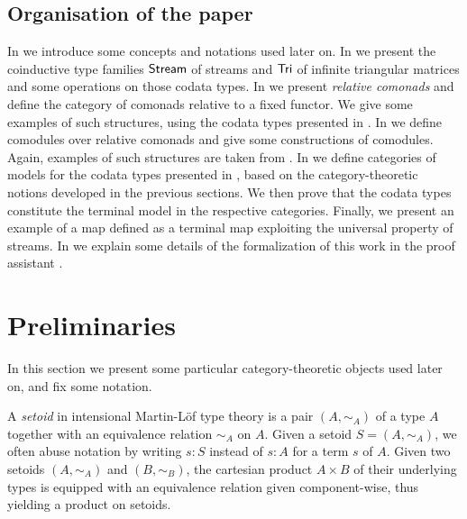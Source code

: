 \documentclass[a4paper,USenglish]{lipics}
\begin{document}
\begin{Long}
 
 \subsection{Organisation of the paper}
  In  we introduce some concepts and notations used later on.
  In  we present the coinductive type families $\mathsf{Stream}$ of streams and $\mathsf{Tri}$ of infinite triangular matrices and some operations on those codata types.
  In  we present \emph{relative comonads} and define the category of comonads relative to a fixed functor.
    We give some examples of such structures, using the codata types presented in .
  In  we define comodules over relative comonads and give some constructions of comodules.
     Again, examples of such structures are taken from .
  In  we define categories of models for the codata types presented in ,
      based on the category-theoretic notions developed in the previous sections.
      We then prove that the codata types constitute the terminal model in the respective categories.
      Finally, we present an example of a map defined as a terminal map exploiting the universal property of streams.
  In  we explain some details of the formalization of this work in the proof assistant \coq.

\end{Long}


\section{Preliminaries}\label{sec:preliminaries}

In this section we present some particular category-theoretic objects used later on, and fix some notation.

\begin{defn}
  A \emph{setoid} in intensional Martin-Löf type theory is a pair $(A, \sim_A)$ of a type $A$ together with an equivalence 
  relation $\sim_A$ on $A$. Given a setoid $S = (A, \sim_A)$, we often abuse notation by writing $s:S$ instead of $s:A$ for
  a term $s$ of $A$.
  Given two setoids $(A,\sim_A)$ and $(B,\sim_B)$, the cartesian product $A\times B$ of their underlying types is equipped with
  an equivalence relation given component-wise, thus yielding a product on setoids.
\end{defn}
\end{document}
